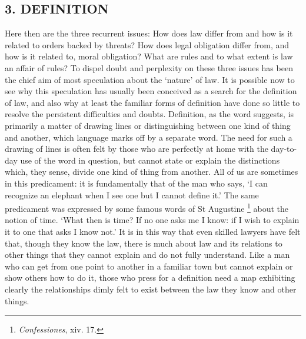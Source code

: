 \documentclass[12pt,oneside]{book}  %
\begin{document}
\subsection{\texorpdfstring{\textbf{3.
DEFINITION}}{3. DEFINITION}}\label{definition}

Here then are the three recurrent issues: How does law differ from and
how is it related to orders backed by threats? How does legal obligation
differ from, and how is it related to, moral obligation? What are rules
and to what extent is law an affair of rules? To dispel doubt and
perplexity on these three issues has been the chief aim of most
speculation about the `nature' of law. It is possible now to see why
this speculation has usually been conceived as a search for the
definition of law, and also why at least the familiar forms of
definition have done so little to resolve the persistent difficulties
and doubts. Definition, as the word suggests, is primarily a matter of
drawing lines or distinguishing between one kind of thing and another,
which language marks off by a separate word. The need for such a drawing
of lines is often felt by those who are perfectly at home with the
day-to-day use of the word in question, but cannot state or explain the
distinctions which, they sense, divide one kind of thing from another.
All of us are sometimes in this predicament: it is fundamentally that of
the man who says, `I can recognize an elephant when I see one but I
cannot define it.' The same predicament was expressed by some famous
words of St Augustine \footnote{\emph{Confessiones}, xiv. 17.} about the
notion of time. `What then is time? If no one asks me I know: if I wish
to explain it to one that asks I know not.' It is in this way that even
skilled lawyers have felt that, though they know the law, there is much
about law and its relations to other things that they cannot explain and
do not fully understand. Like a man who can get from one point to
another in a familiar town but cannot explain or show others how to do
it, those who press for a definition need a map exhibiting clearly the
relationships dimly felt to exist between the law they know and other
things.
\end{document}
